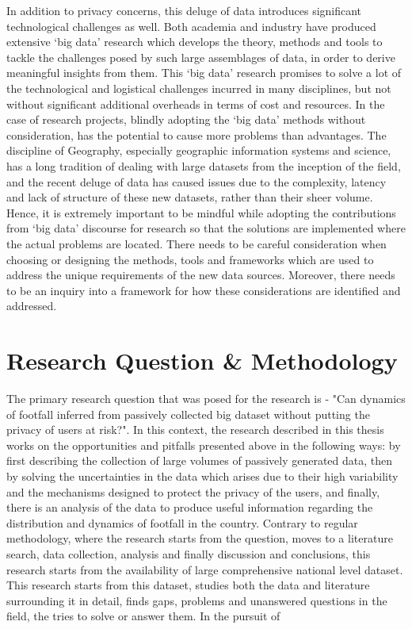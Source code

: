 In addition to privacy concerns, this deluge of data introduces significant technological challenges as well. 
Both academia and industry have produced extensive `big data' research which develops the theory, methods and tools to tackle the challenges posed by such large assemblages of data, in order to derive meaningful insights from them.
This `big data' research promises to solve a lot of the technological and logistical challenges incurred in many disciplines, but not without significant additional overheads in terms of cost and resources.
In the case of research projects, blindly adopting the `big data' methods without consideration, has the potential to cause more problems than advantages.
The discipline of Geography, especially geographic information systems and science, has a long tradition of dealing with large datasets from the inception of the field, and the recent deluge of data has caused issues due to the complexity, latency and lack of structure of these new datasets, rather than their sheer volume.
Hence, it is extremely important to be mindful while adopting the contributions from `big data' discourse for research so that the solutions are implemented where the actual problems are located.
There needs to be careful consideration when choosing or designing the methods, tools and frameworks which are used to address the unique requirements of the new data sources.
Moreover, there needs to be an inquiry into a framework for how these considerations are identified and addressed.

\section{Research Question \& Methodology}

The primary research question that was posed for the research is - "Can dynamics of footfall inferred from passively collected big dataset without putting the privacy of users at risk?".
In this context, the research described in this thesis works on the opportunities and pitfalls presented above in the following ways: by first describing the collection of large volumes of passively generated data, then by solving the uncertainties in the data which arises due to their high variability and the mechanisms designed to protect the privacy of the users, and finally, there is an analysis of the data to produce useful information regarding the distribution and dynamics of footfall in the country.
Contrary to regular methodology, where the research starts from the question, moves to a literature search, data collection, analysis and finally discussion and conclusions, this research starts from the availability of large comprehensive national level dataset.
This research starts from this dataset, studies both the data and literature surrounding it in detail, finds gaps, problems and unanswered questions in the field, the tries to solve or answer them. In the pursuit of 

